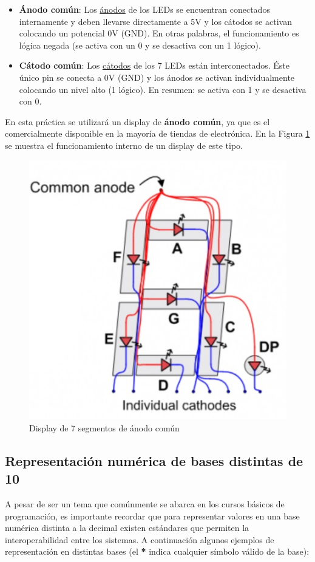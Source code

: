 \begin{itemize}
    \item \textbf{Ánodo común}: Los \underline{ánodos} de los LEDs se encuentran conectados internamente y deben llevarse directamente a 5V y los cátodos se activan colocando un potencial 0V (GND). En otras palabras,
    el funcionamiento es lógica negada (se activa con un 0 y se desactiva con un 1 lógico).
    \item \textbf{Cátodo común}: Los \underline{cátodos} de los 7 LEDs están interconectados. Éste único pin se conecta a 0V (GND) y los ánodos se activan individualmente colocando un 
    nivel alto (1 lógico). En resumen: se activa con 1 y se desactiva con 0.
\end{itemize}

En esta práctica se utilizará un display de \textbf{ánodo común}, ya que es el comercialmente disponible en la mayoría de tiendas de electrónica.
En la Figura \ref{Fig:CommonAnode} se muestra el funcionamiento interno de un display de este tipo.

\begin{figure}[H]
    \centering
    \includegraphics[scale=0.5]{images/CommonAnode.jpg}
    \caption{Display de 7 segmentos de ánodo común}
    \label{Fig:CommonAnode}
\end{figure}

\subsection{Representación numérica de bases distintas de 10}
A pesar de ser un tema que comúnmente se abarca en los cursos básicos de programación, es importante recordar que para representar valores
en una base numérica distinta a la decimal existen estándares que permiten la interoperabilidad entre los sistemas. A continuación algunos ejemplos
de representación en distintas bases (el \textbf{*} indica cualquier símbolo válido de la base):

